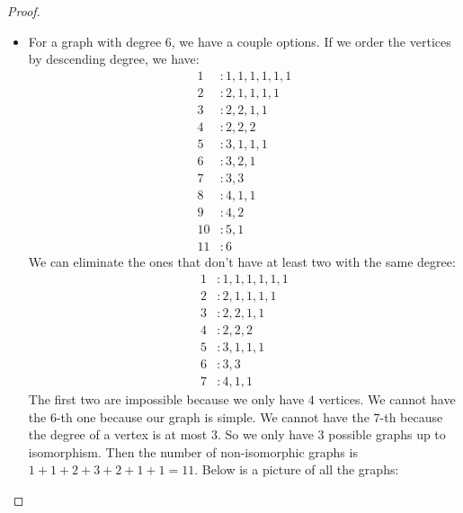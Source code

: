 \documentclass{article}
\begin{document}
\begin{proof}
\begin{itemize}
                \item For a graph with degree $6$, we have a couple options. If we order the vertices by descending degree, we have:
                    \begin{align*}
                        1  &: 1, 1, 1, 1, 1, 1 \\
                        2  &: 2, 1, 1, 1, 1    \\
                        3  &: 2, 2, 1, 1       \\
                        4  &: 2, 2, 2          \\
                        5  &: 3, 1, 1, 1       \\
                        6  &: 3, 2, 1          \\
                        7  &: 3, 3             \\
                        8  &: 4, 1, 1          \\
                        9  &: 4, 2             \\
                        10 &: 5, 1             \\
                        11 &: 6                  
                    \end{align*}
                We can eliminate the ones that don't have at least two with the same degree:
                    \begin{align*}
                        1 &: 1, 1, 1, 1, 1, 1 \\
                        2 &: 2, 1, 1, 1, 1    \\
                        3 &: 2, 2, 1, 1       \\
                        4 &: 2, 2, 2          \\
                        5 &: 3, 1, 1, 1       \\
                        6 &: 3, 3             \\
                        7 &: 4, 1, 1            
                    \end{align*}
                The first two are impossible because we only have $4$ vertices. We cannot have the $6$-th one because our graph is simple. We cannot have the $7$-th because the degree of a vertex is at most $3$.  So we only have $3$ possible graphs up to isomorphism. Then the number of non-isomorphic graphs is $1 + 1 + 2 + 3 + 2 + 1 + 1 = 11$. Below is a picture of all the graphs:
            \end{itemize}
        \begin{fixedfigure} 
        \end{fixedfigure}
    \end{proof}
\end{document}
